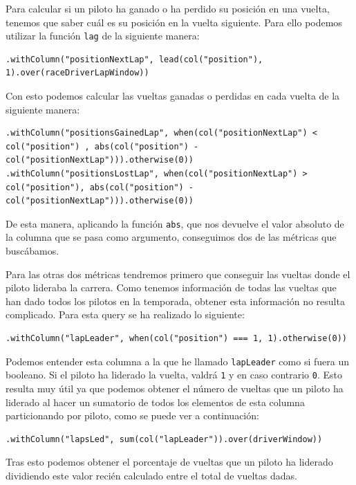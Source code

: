 \documentclass[12pt,twoside,titlepage]{report}
\begin{document}
Para calcular si un piloto ha ganado o ha perdido su posición en una vuelta, tenemos que saber cuál es su posición en la vuelta siguiente. Para ello podemos utilizar la función \texttt{lag} de la siguiente manera:

\begin{lstlisting}
.withColumn("positionNextLap", lead(col("position"), 1).over(raceDriverLapWindow))
\end{lstlisting}


Con esto podemos calcular las vueltas ganadas o perdidas en cada vuelta de la siguiente manera:

\begin{lstlisting}
.withColumn("positionsGainedLap", when(col("positionNextLap") < col("position") , abs(col("position") - col("positionNextLap"))).otherwise(0))
.withColumn("positionsLostLap", when(col("positionNextLap") > col("position"), abs(col("position") - col("positionNextLap"))).otherwise(0))
\end{lstlisting}

De esta manera, aplicando la función \texttt{abs}, que nos devuelve el valor absoluto de la columna que se pasa como argumento, conseguimos dos de las métricas que buscábamos.

Para las otras dos métricas tendremos primero que conseguir las vueltas donde el piloto lideraba la carrera. Como tenemos información de todas las vueltas que han dado todos los pilotos en la temporada, obtener esta información no resulta complicado. Para esta query se ha realizado lo siguiente:

\begin{lstlisting}
.withColumn("lapLeader", when(col("position") === 1, 1).otherwise(0))
\end{lstlisting}

Podemos entender esta columna a la que he llamado \texttt{lapLeader} como si fuera un booleano. Si el piloto ha liderado la vuelta, valdrá \texttt{1} y en caso contrario \texttt{0}. Esto resulta muy útil ya que podemos obtener el número de vueltas que un piloto ha liderado al hacer un sumatorio de todos los elementos de esta columna particionando por piloto, como se puede ver a continuación:

\begin{lstlisting}
.withColumn("lapsLed", sum(col("lapLeader")).over(driverWindow))
\end{lstlisting}

Tras esto podemos obtener el porcentaje de vueltas que un piloto ha liderado dividiendo este valor recién calculado entre el total de vueltas dadas.
\end{document}
